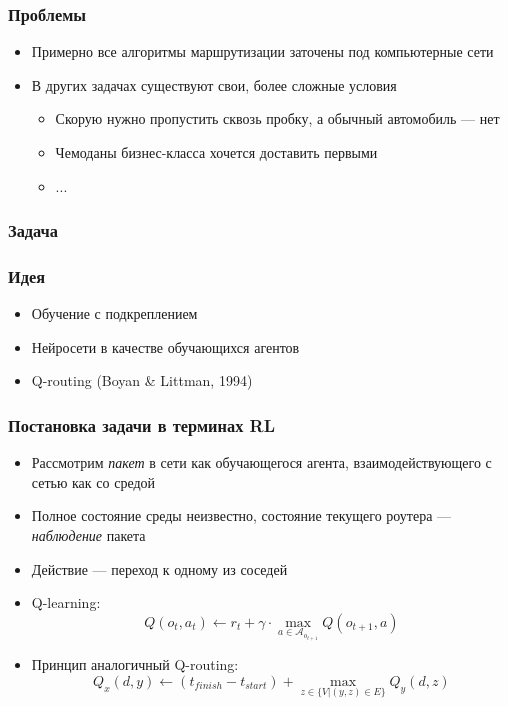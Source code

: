 \documentclass{beamer}
\begin{document}

\begin{frame}
  \frametitle{Проблемы}
  \begin{itemize}
  \item Примерно все алгоритмы маршрутизации заточены под компьютерные сети
  \item В других задачах существуют свои, более сложные условия
    \begin{itemize}
    \item Скорую нужно пропустить сквозь пробку, а обычный автомобиль --- нет
    \item Чемоданы бизнес-класса хочется доставить первыми
    \item ...
    \end{itemize}
  \end{itemize}
\end{frame}


\begin{frame}
  \frametitle{Задача}
\end{frame}


\begin{frame}
  \frametitle{Идея}
  \begin{itemize}
  \item Обучение с подкреплением
  \item Нейросети в качестве обучающихся агентов
  \item Q-routing (Boyan \& Littman, 1994)
  \end{itemize}
\end{frame}


\begin{frame}
  \frametitle{Постановка задачи в терминах RL}
  \begin{itemize}
    \item Рассмотрим \textit{пакет} в сети как обучающегося агента,
      взаимодействующего с сетью как со средой
    \item Полное состояние среды неизвестно, состояние текущего роутера ---
      \textit{наблюдение} пакета
    \item Действие --- переход к одному из соседей
    \item Q-learning:
      \[
      Q(o_t, a_t) \leftarrow r_t + \gamma \cdot
      \max\limits_{a \in \mathcal{A}_{o_{t+1}}} {Q(o_{t+1}, a)}
      \]
    \item Принцип аналогичный Q-routing:
      \[
      Q_x(d, y) \leftarrow (t_{finish} - t_{start}) +
      \max\limits_{z \in \{ V | (y, z) \in E\}} {Q_y(d, z)}
      \]
  \end{itemize}
\end{frame}
\end{document}

